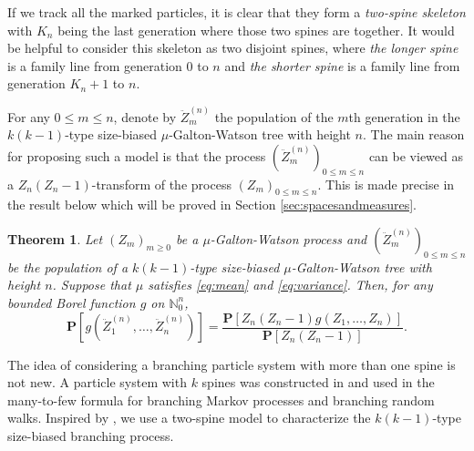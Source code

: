 \documentclass[12pt,a4paper]{amsart}
\newtheorem{thm}{Theorem}[section]
\numberwithin{equation}{section}
\begin{document}
	If we track all the marked particles, it is clear that they form a \emph{two-spine skeleton} with $K_n$ being the last generation where those two spines are together.
	It would be helpful to consider this skeleton as two disjoint spines,
	where \emph{the longer spine} is a family line from generation $0$ to $n$ and \emph{the shorter spine} is a family line from generation $K_n+1$ to $n$.
	
	For any $0\le m \le n$, denote by $\ddot Z_m^{(n)}$ the population of the $m$th generation in the $k(k-1)$-type size-biased $\mu$-Galton-Watson tree with height $n$.
	The main reason for proposing such a model is that the process $(\ddot Z_m^{(n)})_{0\le m\le n}$ can be viewed as 
    a $Z_n(Z_n-1)$-transform of the process $(Z_m)_{0\le m\le n}$.
	This is made precise in the result below which will be proved in Section \ref{sec:spacesandmeasures}.
\begin{thm}
\label{thm: change of measure}
	Let $(Z_m)_{m\ge 0}$ be a $\mu$-Galton-Watson process and $(\ddot Z_m^{(n)})_{0\le m\le n}$ be the population of a $k(k-1)$-type size-biased $\mu$-Galton-Watson tree with height $n$.
	Suppose that $\mu$ satisfies \eqref{eq:mean} and \eqref{eq:variance}.
	Then, for any bounded Borel function $g$ on $\mathbb N^{n}_0$,
\begin{equation*}
		\mathbf P[ g ( \ddot Z_1^{(n)}, \dots, \ddot Z_n^{(n)})]
	=
		\frac{ \mathbf P[ Z_n(Z_n-1) g( Z_1, \dots, Z_n)]} {\mathbf P [ Z_n ( Z_n - 1)]}.			
\end{equation*}
\end{thm}

	The idea of considering a branching particle system with more than one spine is not new.
	A particle system with $k$ spines  was constructed in \cite{harris2015many} and used in the  many-to-few formula for branching Markov processes and branching random walks.
	Inspired by \cite{harris2015many}, we use a two-spine model to characterize the $k(k-1)$-type size-biased branching process.
\end{document}
